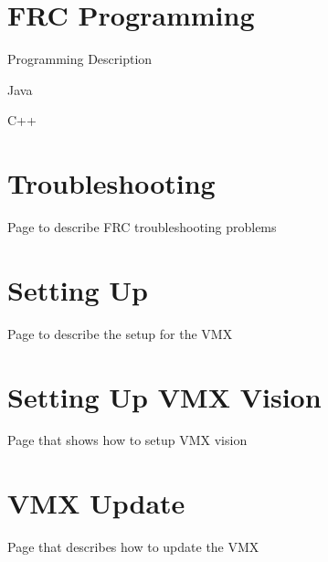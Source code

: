\documentclass[letterpaper,10pt,english]{sphinxmanual}
\begin{document}
\chapter{FRC Programming}
\label{\detokenize{docs/FRCTraining/programming:frc-programming}}\label{\detokenize{docs/FRCTraining/programming::doc}}
Programming Description

Java

C++

\begin{sphinxVerbatim}[commandchars=\\\{\}]
     
\end{sphinxVerbatim}

\begin{sphinxVerbatim}[commandchars=\\\{\}]
   
\end{sphinxVerbatim}


\chapter{Troubleshooting}
\label{\detokenize{docs/FRCTraining/troubleshooting:troubleshooting}}\label{\detokenize{docs/FRCTraining/troubleshooting::doc}}
Page to describe FRC troubleshooting problems


\chapter{Setting Up}
\label{\detokenize{docs/VMX/setup:setting-up}}\label{\detokenize{docs/VMX/setup::doc}}
Page to describe the set\sphinxhyphen{}up for the VMX


\chapter{Setting Up VMX Vision}
\label{\detokenize{docs/VMX/vision:setting-up-vmx-vision}}\label{\detokenize{docs/VMX/vision::doc}}
Page that shows how to setup VMX vision


\chapter{VMX Update}
\label{\detokenize{docs/VMX/update:vmx-update}}\label{\detokenize{docs/VMX/update::doc}}
Page that describes how to update the VMX
\end{document}

